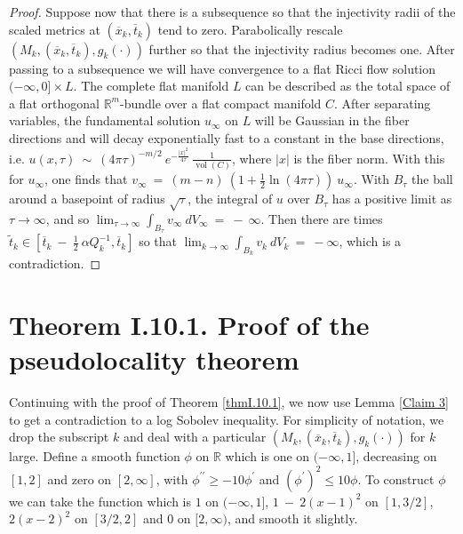 \documentclass[12pt]{amsart}
\newcommand{\R}{{\mathbb R}}
\newcommand{\vol}{\operatorname{vol}}
\numberwithin{equation}{section}
\theoremstyle{plain}
\theoremstyle{definition}
\theoremstyle{remark}
\begin{document}
\begin{proof}
Suppose now that there is a subsequence so that
the injectivity radii of the scaled metrics 
at $(\overline{x}_k, \overline{t}_k)$ tend to zero.
Parabolically rescale $(M_k,(\overline{x}_k, \overline{t}_k), g_k(\cdot))$ 
further so that the injectivity radius becomes one. After passing to a
subsequence we will have convergence to a flat Ricci flow solution
$(-\infty, 0] \times L$. The complete 
flat manifold $L$ can be described as the total space of a flat 
orthogonal
$\R^m$-bundle over a flat compact manifold $C$. After separating
variables, the
fundamental solution $u_\infty$ on $L$ will be Gaussian in the fiber directions and will
decay exponentially fast to a constant in the base directions, i.e.
$u(x, \tau) \: \sim \: (4\pi \tau)^{-m/2} \: e^{- \frac{|x|^2}{4\tau}} \:
\frac{1}{\vol(C)}$, where $|x|$ is the fiber norm. With this for $u_\infty$,
one finds that
$v_\infty \: = \: (m - n) \: \left( 1 + \frac12 \ln(4 \pi \tau) \right) \: u_\infty$.
With $B_\tau$ the ball around a basepoint 
of radius $\sqrt{\tau}$, the integral of $u$ over
$B_\tau$ has a positive limit as $\tau \rightarrow \infty$, and so 
$\lim_{\tau \rightarrow \infty} \int_{B_\tau} v_\infty \: dV_\infty \: = \: - \: \infty$.
Then there are times $\widetilde{t}_k
\in [\overline{t}_k \: - \: \frac12 \: \alpha Q_k^{-1}, \overline{t}_k]$ so that
$\lim_{k \rightarrow \infty}
\int_{B_k} v_k \: dV_k \: = \: - \infty$, which is a contradiction.
\end{proof}

\section{Theorem I.10.1. Proof of the pseudolocality theorem} \label{pfI.10.1}

Continuing with the proof of Theorem \ref{thmI.10.1}, we now use
Lemma \ref{Claim 3} to get a contradiction to a log Sobolev inequality. 
For simplicity of notation, we drop the subscript $k$ and deal with a 
particular $(M_k, (\overline{x}_k, \overline{t}_k), g_k(\cdot))$ for
$k$ large.
Define a smooth function $\phi$ on $\R$ which is
one on $(- \infty, 1]$, decreasing on $[1,2]$ and zero on $[2, \infty]$,
with $\phi^{\prime \prime} \ge  - 10 \phi^\prime$ and
$(\phi^\prime)^2 \le 10 \phi$. To construct $\phi$ we can 
take the function which is $1$ on $(-\infty, 1]$,
$1 \: - \: 2(x-1)^2$ on $[1, 3/2]$, $2(x-2)^2$ on $[3/2, 2]$ and
$0$ on $[2, \infty)$, and
smooth it slightly.
\end{document}
